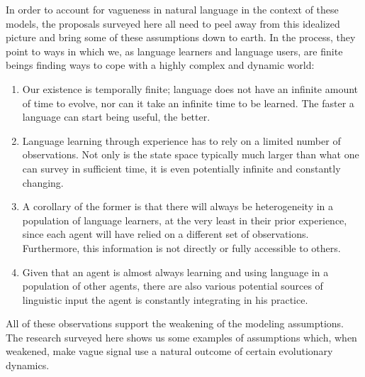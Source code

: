 \documentclass[a4paper]{article}
\begin{document}
In order to account for vagueness in natural language in the context of these models, the proposals surveyed here all need to peel away from this idealized picture and bring some of these assumptions down to earth.
In the process, they point to ways in which we, as language learners and language users, are finite beings finding ways to cope with a highly complex and dynamic world:
\begin{enumerate}
\item Our existence is temporally finite; language does not have an infinite amount of time to evolve, nor can it take an infinite time to be learned. The faster a language can start being useful, the better.
\item Language learning through experience has to rely on a limited number of observations. Not only is the state space typically much larger than what one can survey in sufficient time, it is even potentially infinite and constantly changing.
\item A corollary of the former is that there will always be heterogeneity in a population of language learners, at the very least in their prior experience, since each agent will have relied on a different set of observations. Furthermore, this information is not directly or fully accessible to others.
\item Given that an agent is almost always learning and using language in a population of other agents, there are also various potential sources of linguistic input the agent is constantly integrating in his practice.
\end{enumerate}
All of these observations support the weakening of the modeling assumptions.
The research surveyed here shows us some examples of assumptions which, when weakened, make vague signal use a natural outcome of certain evolutionary dynamics.
\end{document}
